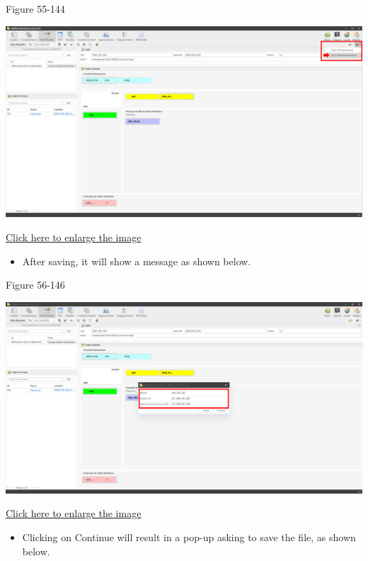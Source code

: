 \documentclass[
]{book}
\providecommand{\tightlist}{%
  \setlength{\itemsep}{0pt}\setlength{\parskip}{0pt}}
\theoremstyle{definition}
\theoremstyle{definition}
\theoremstyle{definition}
\theoremstyle{definition}
\theoremstyle{remark}
\begin{document}
Figure 55-144

\begin{center}\includegraphics[width=1\linewidth]{./images/image144} \end{center}

\href{images/image144.png}{Click here to enlarge the image}

\begin{itemize}
\tightlist
\item
  After saving, it will show a message as shown below.
\end{itemize}

Figure 56-146

\begin{center}\includegraphics[width=1\linewidth]{./images/image146} \end{center}

\href{images/image146.png}{Click here to enlarge the image}

\begin{itemize}
\tightlist
\item
  Clicking on Continue will result in a pop-up asking to save the file, as shown below.
\end{itemize}
\end{document}
